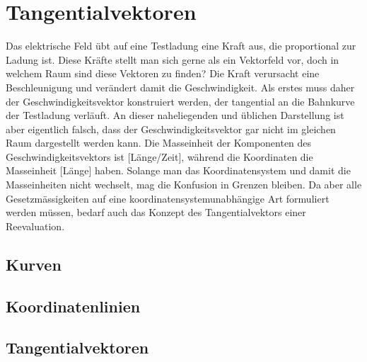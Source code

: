 %
%
%
\section{Tangentialvektoren
\label{buch:koordinaten:section:tangentialvektoren}}
Das elektrische Feld übt auf eine Testladung eine Kraft aus, die
proportional zur Ladung ist.
Diese Kräfte stellt man sich gerne als ein Vektorfeld vor, doch
in welchem Raum sind diese Vektoren zu finden?
Die Kraft verursacht eine Beschleunigung und verändert damit 
die Geschwindigkeit.
Als erstes muss daher der Geschwindigkeitsvektor konstruiert werden,
der tangential an die Bahnkurve der Testladung verläuft.
An dieser naheliegenden und üblichen Darstellung ist aber eigentlich
falsch, dass der Geschwindigkeitsvektor gar nicht im gleichen Raum
dargestellt werden kann.
Die Masseinheit der Komponenten des Geschwindigkeitsvektors ist
[Länge/Zeit], während die Koordinaten die Masseinheit [Länge] haben.
Solange man das Koordinatensystem und damit die Masseinheiten nicht
wechselt, mag die Konfusion in Grenzen bleiben.
Da aber alle Gesetzmässigkeiten auf eine koordinatensystemunabhängige
Art formuliert werden müssen, bedarf auch das Konzept des Tangentialvektors
einer Reevaluation.

\subsection{Kurven}

\subsection{Koordinatenlinien}

\subsection{Tangentialvektoren}


